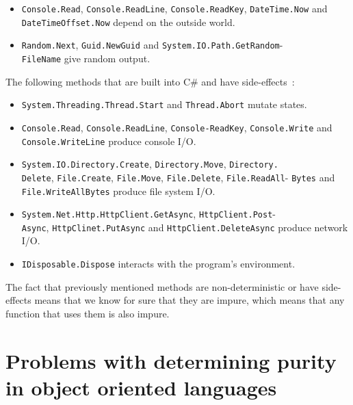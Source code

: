 \documentclass[a4paper,12pt]{article}
\begin{document}
\begin{itemize}
  \item \texttt{Console.Read}, \texttt{Console.ReadLine}, \texttt{Console.ReadKey}, \texttt{DateTime\allowbreak.Now} and \texttt{DateTimeOffset.Now} depend on the outside world.
\item \texttt{Random.Next}, \texttt{Guid.NewGuid} and \texttt{System.IO.Path.GetRandom}-\\\texttt{\allowbreak FileName} give random output.
\end{itemize}

The following methods that are built into C\# and have side-effects~\cite{dixin2015}:

\begin{itemize}
  \item \texttt{System.Threading.Thread.Start} and \texttt{Thread.Abort} mutate states.
  \item \texttt{Console.Read}, \texttt{Console.ReadLine}, \texttt{Console-ReadKey}, \texttt{Console.\allowbreak Write} and \texttt{Console.WriteLine} produce console I/O.
  \item \texttt{System.IO.Directory.Create}, \texttt{Directory.Move}, \texttt{Directory.}\\\texttt{Delete}, \texttt{File.Create}, \texttt{File.Move}, \texttt{File.Delete}, \texttt{File.ReadAll\allowbreak }- \texttt{Bytes} and \texttt{File.WriteAllBytes} produce file system I/O.
\item \texttt{System.Net.Http.HttpClient.GetAsync}, \texttt{HttpClient.Post}- \\\texttt{Async}, \texttt{HttpClinet.PutAsync} and \texttt{HttpClient.DeleteAsync} produce network I/O.
  \item \texttt{IDisposable.Dispose} interacts with the program's environment.
\end{itemize}

The fact that previously mentioned methods are non-deterministic or have side-effects means that we know for sure that they are impure, which means that any function that uses them is also impure.

\section{Problems with determining purity in object oriented languages} \label{sec:Problems with determining purity in object oriented languages}
\end{document}
